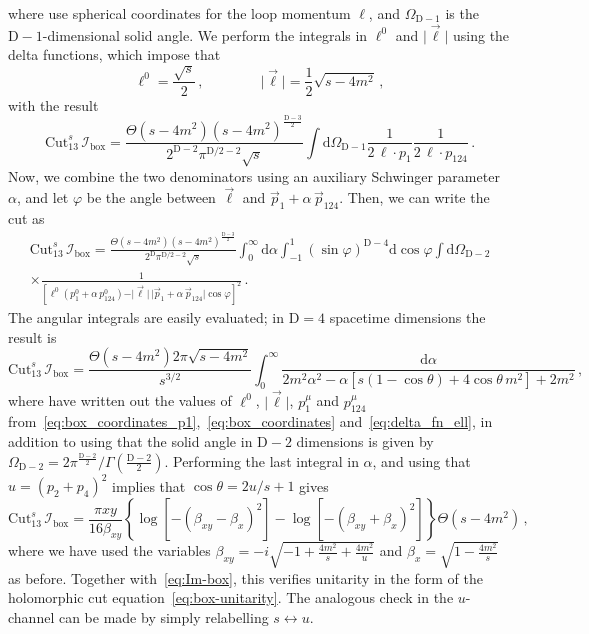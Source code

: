 \documentclass[12pt]{article}
\numberwithin{figure}{section}
\def \be {\begin{equation}}
\def \ee {\end{equation}}
\def \D {\mathrm{D}}
\def \d {\mathrm{d}}
\def \I {\mathcal{I}}
\def \boxx {\mathrm{box}}
\def \Cut {\mathrm{Cut}}
\begin{document}
    where use spherical coordinates for the loop momentum $\ell$, and $\Omega_{\D-1}$ is the  $\D{-}1$-dimensional solid angle.
    We perform the integrals in $\ell^0$ and $\vert \vec{\ell} \vert$ using the delta functions, which impose that
    \begin{equation}
    \label{eq:delta_fn_ell}
        \ell^0 = \frac{\sqrt{s}}{2} \,, \qquad \qquad
        \vert \vec{\ell} \vert = \frac{1}{2}\sqrt{s-4 m^2} \,,
    \end{equation}
    with the result
    \be
        \Cut_{13}^s \, \I_\boxx =
        \frac{\Theta(s-4m^2) (s-4 m^2)^{\frac{\D-3}{2}}}{2^{\D-2} \pi^{\D/2-2} \sqrt{s} }  
        \int \d \Omega_{\D-1} 
        \frac{1}{2 \, \ell \cdot p_1}
        \frac{1}{2 \, \ell \cdot p_{124}}
        \,.
    \ee
    Now, we combine the two denominators using an auxiliary Schwinger parameter $\alpha$, and let $\varphi$ be the angle between $\vec{\ell}$ and $\vec{p}_1+\alpha \, \vec{p}_{124}$. Then, we can write the cut as
    \begin{multline} 
        \Cut_{13}^s \, \I_\boxx  =
        \frac{\Theta(s-4m^2)(s-4 m^2)^{\frac{\D-3}{2}}}{2^\D \pi^{\D/2-2} \sqrt{s} }  
        \int_0^\infty \d\alpha
        \int_{-1}^1 \left(\sin \varphi\right)^{\D-4} \d \cos \varphi  
        \int \d \Omega_{\D-2} 
        \\ \times
        \frac{1}{\left[\ell^0 (p_1^0+\alpha \, p_{124}^0) - \vert \vec{\ell} \vert \, \vert \vec{p}_1 + \alpha \, \vec{p}_{124} \vert \cos \varphi \right]^2} \,.
    \end{multline}
    The angular integrals are easily evaluated; in $\D=4$ spacetime dimensions the result is
    \be
        \Cut_{13}^s \, \I_\boxx =
        \frac{\Theta(s-4m^2) 2 \pi \sqrt{s-4 m^2}}{s^{3/2} }
        \int_0^\infty 
        \frac{\d\alpha}{2 m^2 \alpha^2 - \alpha[s (1-\cos \theta)+4 \cos \theta \, m^2] +2 m^2} \,,
    \ee  
    where have written out the values of $\ell^0$, $\vert \vec{\ell} \vert$, $p_1^\mu$ and $p_{124}^\mu$ from~\eqref{eq:box_coordinates_p1},~\eqref{eq:box_coordinates} and~\eqref{eq:delta_fn_ell}, in addition to using that the solid angle in $\D{-}2$ dimensions is given by $\Omega_{\D-2} = 2 \pi^{\frac{\D-2}{2}} /\Gamma \left(\frac{\D-2}{2}\right)$. Performing the last integral in $\alpha$, and using that $u=(p_2+p_4)^2$ implies that $\cos \theta = 2 u/s+1$ gives
    \be 
	    \Cut_{13}^s \, \I_\boxx = \frac{\pi x y}{16 \beta_{xy}}  \left\{
	    \log\left[- ( \beta_{xy}-\beta_x)^2 \right]
	    -
	    \log\left[- ( \beta_{xy}+\beta_x)^2 \right]
	    \right\} \Theta(s-4m^2) \,,
	\ee  
    where we have used the variables $\beta_{xy} = - i \sqrt{-1+\frac{4m^2}{s}+\frac{4m^2}{u}}$ and $\beta_x=\sqrt{1-\frac{4m^2}{s}}$ as before.
    Together with~\eqref{eq:Im-box}, this verifies unitarity in the form of the holomorphic cut equation~\eqref{eq:box-unitarity}. The analogous check in the $u$-channel can be made by simply relabelling $s \leftrightarrow u$. 
    
\end{document}
